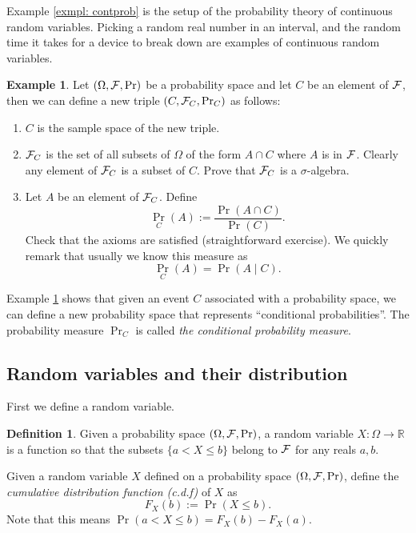 \documentclass[letterpaper, 12pt]{article}
\newcommand{\1}{\mathds{1}} %
\theoremstyle{definition}
\newtheorem{definition}[theorem]{Definition}
\newtheorem{example}[theorem]{Example}
\begin{document}
Example \ref{exmpl: contprob} is the setup of the probability theory of continuous random variables. Picking a random real number in an interval, and the random time it takes for a device to break down are examples of continuous random variables.

\begin{example}
\label{exmpl: conditionalprob}
Let $(\Omega,{\cal F},\Pr)$ be a probability space and let $C$ be an element of ${\cal F}$, then we can define a new triple $(C,{\cal F}_C,\Pr_C)$ as follows:
\begin{enumerate}
\item $C$ is the sample space of the new triple.
\item ${\cal F}_C$ is the set of all subsets of $\Omega$ of the form $A \cap C$ where $A$ is in $\cal F$. Clearly any element of ${\cal F}_C$ is a subset of $C$. Prove that ${\cal F}_C$ is a $\sigma$-algebra.
\item Let $A$ be an element of ${\cal F}_C$. Define \[{\Pr}_C(A) := \dfrac{\Pr(A \cap C)}{\Pr(C)}.\]
Check that the axioms are satisfied (straightforward exercise). We quickly remark that usually we know this measure as \[{\Pr}_C(A) = \Pr(A\mid C).\]
\end{enumerate}
\end{example}

Example \ref{exmpl: conditionalprob} shows that given an event $C$ associated with a probability space, we can define a new probability space that represents ``conditional probabilities''. The probability measure ${\Pr}_{C}$ is called \emph{the conditional probability measure}.


\subsection{Random variables and their distribution}

First we define a random variable.

\begin{definition}
  Given a probability space $(\Omega,{\cal F},\Pr)$,  a random variable $X:\Omega \to \mathbb{R}$ is a function so that the subsets $\{a < X \leq b\}$ belong to $\cal F$ for any reals $a,b$.

  Given a random variable $X$ defined on a probability space $(\Omega,{\cal F},\Pr)$, define the \emph{cumulative distribution function (c.d.f)} of  $X$ as \[F_X(b) := \Pr(X \leq b).\]
Note that this means $\Pr(a < X \leq b) = F_X(b) - F_X(a).$
\end{definition}
\end{document}
